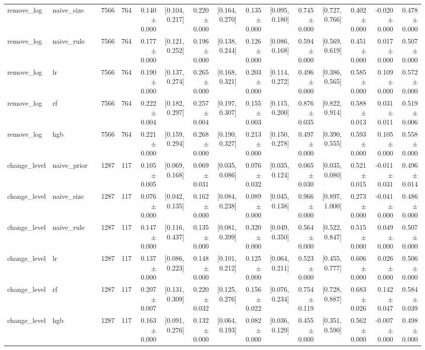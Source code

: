 \begin{table}[htbp]
{\begin{tabular}{llrrrrrrrrrrrrrr}
remove\_log & naive\_size &  & 7566 & 764 & 0.140 $\pm$ 0.000 & [0.104, 0.217] & 0.220 $\pm$ 0.000 & [0.164, 0.270] & 0.135 $\pm$ 0.000 & [0.095, 0.180] & 0.745 $\pm$ 0.000 & [0.727, 0.766] & 0.402 $\pm$ 0.000 & -0.020 $\pm$ 0.000 & 0.478 $\pm$ 0.000 \\
remove\_log & naive\_rule &  & 7566 & 764 & 0.177 $\pm$ 0.000 & [0.121, 0.252] & 0.196 $\pm$ 0.000 & [0.138, 0.244] & 0.126 $\pm$ 0.000 & [0.086, 0.168] & 0.594 $\pm$ 0.000 & [0.569, 0.619] & 0.451 $\pm$ 0.000 & 0.017 $\pm$ 0.000 & 0.507 $\pm$ 0.000 \\
remove\_log & lr &  & 7566 & 764 & 0.190 $\pm$ 0.000 & [0.137, 0.274] & 0.265 $\pm$ 0.000 & [0.168, 0.321] & 0.203 $\pm$ 0.000 & [0.114, 0.272] & 0.496 $\pm$ 0.000 & [0.386, 0.565] & 0.585 $\pm$ 0.000 & 0.109 $\pm$ 0.000 & 0.572 $\pm$ 0.000 \\
remove\_log & rf &  & 7566 & 764 & 0.222 $\pm$ 0.004 & [0.182, 0.297] & 0.257 $\pm$ 0.004 & [0.197, 0.307] & 0.155 $\pm$ 0.003 & [0.115, 0.200] & 0.876 $\pm$ 0.035 & [0.822, 0.914] & 0.588 $\pm$ 0.013 & 0.031 $\pm$ 0.011 & 0.519 $\pm$ 0.006 \\
remove\_log & hgb &  & 7566 & 764 & 0.221 $\pm$ 0.000 & [0.159, 0.294] & 0.268 $\pm$ 0.000 & [0.190, 0.327] & 0.213 $\pm$ 0.000 & [0.150, 0.278] & 0.497 $\pm$ 0.000 & [0.390, 0.555] & 0.593 $\pm$ 0.000 & 0.105 $\pm$ 0.000 & 0.558 $\pm$ 0.000 \\
change\_level & naive\_prior &  & 1287 & 117 & 0.105 $\pm$ 0.005 & [0.069, 0.168] & 0.069 $\pm$ 0.031 & [0.035, 0.086] & 0.076 $\pm$ 0.032 & [0.035, 0.124] & 0.065 $\pm$ 0.030 & [0.035, 0.080] & 0.521 $\pm$ 0.015 & -0.011 $\pm$ 0.031 & 0.496 $\pm$ 0.014 \\
change\_level & naive\_size &  & 1287 & 117 & 0.076 $\pm$ 0.000 & [0.042, 0.135] & 0.162 $\pm$ 0.000 & [0.084, 0.238] & 0.089 $\pm$ 0.000 & [0.045, 0.138] & 0.966 $\pm$ 0.000 & [0.897, 1.000] & 0.273 $\pm$ 0.000 & -0.041 $\pm$ 0.000 & 0.486 $\pm$ 0.000 \\
change\_level & naive\_rule &  & 1287 & 117 & 0.147 $\pm$ 0.000 & [0.116, 0.437] & 0.135 $\pm$ 0.000 & [0.081, 0.399] & 0.320 $\pm$ 0.000 & [0.049, 0.350] & 0.564 $\pm$ 0.000 & [0.522, 0.847] & 0.515 $\pm$ 0.000 & 0.049 $\pm$ 0.000 & 0.507 $\pm$ 0.000 \\
change\_level & lr &  & 1287 & 117 & 0.137 $\pm$ 0.000 & [0.086, 0.223] & 0.148 $\pm$ 0.000 & [0.101, 0.212] & 0.125 $\pm$ 0.000 & [0.064, 0.211] & 0.523 $\pm$ 0.000 & [0.455, 0.777] & 0.606 $\pm$ 0.000 & 0.026 $\pm$ 0.000 & 0.506 $\pm$ 0.000 \\
change\_level & rf &  & 1287 & 117 & 0.207 $\pm$ 0.007 & [0.131, 0.309] & 0.220 $\pm$ 0.032 & [0.125, 0.276] & 0.156 $\pm$ 0.022 & [0.076, 0.234] & 0.754 $\pm$ 0.119 & [0.728, 0.887] & 0.683 $\pm$ 0.026 & 0.142 $\pm$ 0.047 & 0.584 $\pm$ 0.039 \\
change\_level & hgb &  & 1287 & 117 & 0.163 $\pm$ 0.000 & [0.091, 0.276] & 0.132 $\pm$ 0.000 & [0.064, 0.193] & 0.082 $\pm$ 0.000 & [0.036, 0.129] & 0.455 $\pm$ 0.000 & [0.351, 0.590] & 0.562 $\pm$ 0.000 & -0.007 $\pm$ 0.000 & 0.498 $\pm$ 0.000 \\
\bottomrule
\end{tabular}}
\end{table}
